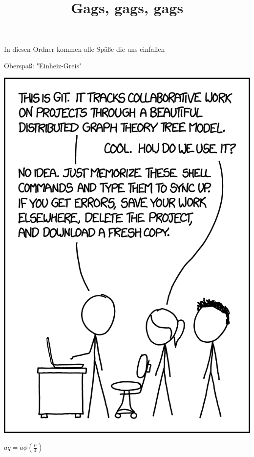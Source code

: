 ﻿\documentclass{article}
\title{Gags, gags, gags}
\begin{document}
\maketitle

In diesen Ordner kommen alle Späße die uns einfallen

Oberspaß: "Einheiz-Greis"

\includegraphics[width=0.5\linewidth]{git_2x.png}

$aq = a \phi \left( \frac{\mu}{4} \right)$
\end{document}
